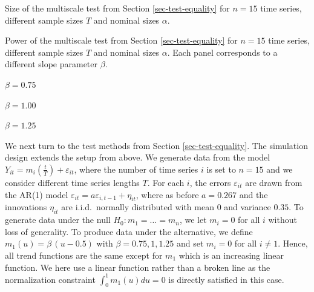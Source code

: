 \addtocounter{table}{-1} 
\begin{table}[t]
\footnotesize{
\begin{center}
\caption{Size of the multiscale test from Section \ref{sec-test-equality} for $n=15$ time series, different sample sizes $T$ and nominal sizes $\alpha$.}
\label{tab:size_equality}
\renewcommand{\arraystretch}{1.2}

\end{center}}
\footnotesize{
\begin{center}
\caption{Power of the multiscale test from Section \ref{sec-test-equality} for $n=15$ time series, different sample sizes $T$ and nominal sizes $\alpha$. Each panel corresponds to a different slope parameter $\beta$.}\label{tab:power_equality}
\begin{subtable}[b]{0.32\textwidth}
\centering
\caption{$\beta = 0.75$}\label{tab:power_75_equality}
\renewcommand{\arraystretch}{1.2}

\end{subtable}
\begin{subtable}[b]{0.32\textwidth}
\centering
\caption{$\beta = 1.00$}\label{tab:power_100_equality}
\renewcommand{\arraystretch}{1.2}

\end{subtable}
\begin{subtable}[b]{0.32\textwidth}
\centering
\caption{$\beta = 1.25$}\label{tab:power_125_equality}
\renewcommand{\arraystretch}{1.2}

\end{subtable}
\end{center}}
\vspace{-0.4cm}
\end{table}


We next turn to the test methods from Section \ref{sec-test-equality}. The simulation design extends the setup from above. We generate data from the model $Y_{it} = m_i(\frac{t}{T}) + \varepsilon_{it}$, where the number of time series $i$ is set to $n = 15$ and we consider different time series lengths $T$. For each $i$, the errors $\varepsilon_{it}$ are drawn from the AR(1) model $\varepsilon_{it} = a \varepsilon_{i,t-1} + \eta_{it}$, where as before $a = 0.267$ and the innovations $\eta_{it}$ are i.i.d.\ normally distributed with mean $0$ and variance $0.35$. To generate data under the null $H_0: m_1 = \ldots = m_n$, we let $m_i = 0$ for all $i$ without loss of generality. To produce data under the alternative, we define $m_1(u) = \beta \, (u - 0.5) $ with $\beta = 0.75, 1, 1.25$ and set $m_i = 0$ for all $i \ne 1$. Hence, all trend functions are the same except for $m_1$ which is an increasing linear function. We here use a linear function rather than a broken line as the normalization constraint $\int_0^1 m_1(u) du = 0$ is directly satisfied in this case. 


